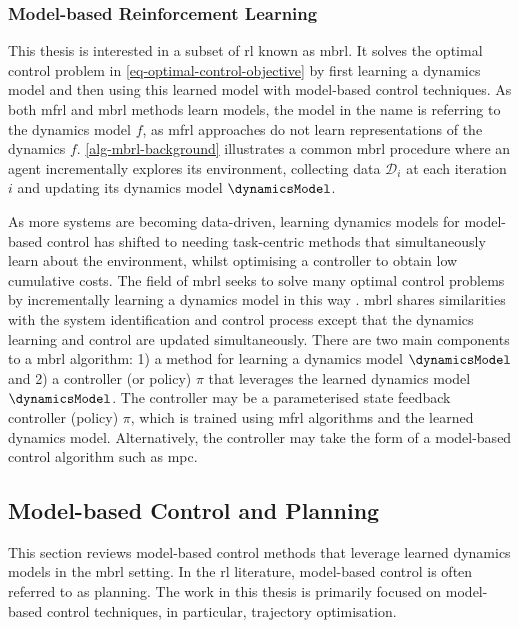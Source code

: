 \documentclass{mimosis-class/mimosis}
\numberwithin{equation}{chapter}
\begin{document}
\subsubsection{Model-based Reinforcement Learning}
\label{sec:org0e0dc9e}
This thesis is interested in a subset of \acrshort{rl} known as \acrfull{mbrl}.
It solves the optimal control problem in \cref{eq-optimal-control-objective}
by first learning a dynamics model and then using this learned model with model-based control techniques.
As both \acrfull{mfrl} and \acrshort{mbrl} methods learn models,
the model in the name is referring to the dynamics model \(f\), as  \acrshort{mfrl} approaches do not learn
representations of the dynamics \(f\).
\cref{alg-mbrl-background} illustrates a common \acrshort{mbrl} procedure where an agent incrementally explores
its environment, collecting data \(\mathcal{D}_i\) at each iteration \(i\) and
updating its dynamics model \(\dynamicsModel\).


As more systems are becoming data-driven, learning dynamics models for model-based control has shifted to
needing task-centric methods that simultaneously learn about the environment, whilst optimising a controller
to obtain low cumulative costs.
The field of \acrshort{mbrl} seeks to solve many optimal control problems by incrementally learning a dynamics model
in this way \citep{deisenrothPILCO2011,chuaDeep2018}.
\acrshort{mbrl} shares similarities with the system identification and control process except that the dynamics learning
and control are updated simultaneously.
There are two main components to a \acrshort{mbrl} algorithm: 1) a method for learning a dynamics
model \(\dynamicsModel\) and 2) a controller (or policy) \(\pi\) that leverages the learned dynamics model \(\dynamicsModel\).
The controller may be a parameterised state feedback controller (policy) \(\pi\), which is trained using
\acrshort{mfrl} algorithms and the learned dynamics model.
Alternatively, the controller may take the form of a model-based control algorithm such as \acrfull{mpc}.

\subsection{Model-based Control and Planning}
\label{sec:orgc2201e5}
This section reviews model-based control methods that leverage learned dynamics models in the \acrshort{mbrl} setting.
In the \acrshort{rl} literature, model-based control is often referred to as planning.
The work in this thesis is primarily focused on model-based control techniques,
in particular, trajectory optimisation.
\end{document}
